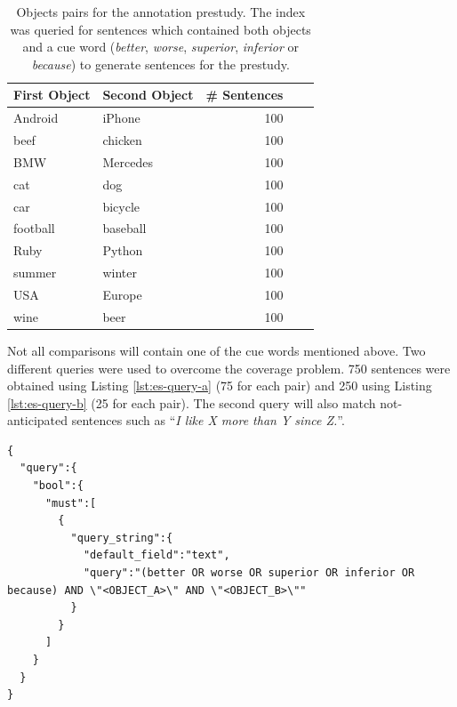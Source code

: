 \begin{table}[h]
\centering
\caption{Objects pairs for the annotation prestudy. The index was queried for sentences which contained both objects and a cue word (\emph{better}, \emph{worse}, \emph{superior}, \emph{inferior} or \emph{because}) to generate sentences for the prestudy.}
\label{tbl:prestudy-objects}
\begin{tabular}{@{}llrrr@{}}
\toprule
First Object & Second Object      & \# Sentences                             \\ \midrule
Android & iPhone    &   100  \\
beef & chicken & 100   \\
BMW    & Mercedes    & 100  \\
cat & dog      &     100  \\ 
car & bicycle & 100 \\
football & baseball   &  100 \\ 
Ruby    & Python    & 100      \\
summer & winter &  100\\
USA & Europe & 100 \\
wine & beer  & 100  \\
\bottomrule  
                               
\end{tabular}
\end{table}

Not all comparisons will contain one of the cue words mentioned above. Two different queries were used to overcome the coverage problem. 750 sentences were obtained using Listing \ref{lst:es-query-a} (75 for each pair) and 250 using Listing \ref{lst:es-query-b} (25 for each pair). The second query will also match not-anticipated sentences such as \enquote{\emph{I like X more than Y since Z.}}.



\begin{lstlisting}[label=lst:es-query-a,breaklines=true,postbreak=\mbox{\textcolor{red}{$\hookrightarrow$}\space},caption=The first query used to extract the sentences for the prestudy from the ElasticSearch index. OBJECT\_A and OBJECT\_B are placeholders for the first and second object.]
{
  "query":{
    "bool":{
      "must":[
        {
          "query_string":{
            "default_field":"text",
            "query":"(better OR worse OR superior OR inferior OR because) AND \"<OBJECT_A>\" AND \"<OBJECT_B>\""
          }
        }
      ]
    }
  }
}
\end{lstlisting}

